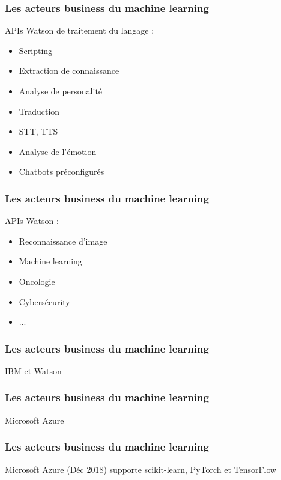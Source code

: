 \documentclass{formation}
\begin{document}
\begin{frame}
  \frametitle{Les acteurs business du machine learning}
  APIs Watson de traitement du langage : \\
  \begin{minipage}[c]{0.49\linewidth}
    \begin{itemize}
    \item Scripting
    \item Extraction de connaissance
    \item Analyse de personalité
    \item Traduction
    \end{itemize}
  \end{minipage}\hfill
  \begin{minipage}[c]{0.50\linewidth}
    \begin{itemize}
    \item STT, TTS
    \item Analyse de l'émotion
    \item Chatbots préconfigurés
    \end{itemize}
  \end{minipage}\hfill
\end{frame}

\begin{frame}
  \frametitle{Les acteurs business du machine learning}
  APIs Watson :
  \begin{itemize}
  \item Reconnaissance d'image
  \item Machine learning
  \item Oncologie
  \item Cybersécurity
  \item ...
  \end{itemize}
\end{frame}

\begin{frame}
  \frametitle{Les acteurs business du machine learning}
  IBM et Watson
\end{frame}

\begin{frame}
  \frametitle{Les acteurs business du machine learning}
  Microsoft Azure
\end{frame}

\begin{frame}
  \frametitle{Les acteurs business du machine learning}
  Microsoft Azure
  \newline
  (Déc 2018) supporte scikit-learn, PyTorch et TensorFlow
\end{frame}
\end{document}
